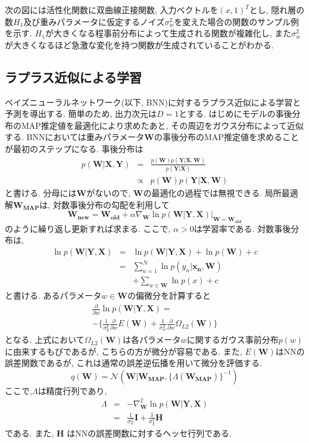 \documentclass[twocolumn]{jarticle}
\begin{document}
次の図には活性化関数に双曲線正接関数, 入力ベクトルを${(x, 1)^T}$とし, 隠れ層の数${H_1}$及び重みパラメータに仮定するノイズ${\sigma_w^2}$を変えた場合の関数のサンプル例を示す. ${H_1}$が大きくなる程事前分布によって生成される関数が複雑化し, また${\sigma_w^2}$が大きくなるほど急激な変化を持つ関数が生成されていることがわかる.

\subsection{ラプラス近似による学習}
ベイズニューラルネットワーク(以下, BNN)に対するラプラス近似による学習と予測を導出する. 簡単のため, 出力次元は${D = 1}$とする. はじめにモデルの事後分布のMAP推定値を最適化により求めたあと, その周辺をガウス分布によって近似する. BNNにおいては重みパラメータ${\bm {W}}$の事後分布のMAP推定値を求めることが最初のステップになる. 事後分布は
\begin{eqnarray}
  p(\bm {W|X, Y}) &=& \frac{p(\bm {W})p(\bm {Y|X, W})}{p(\bm {Y|X})} \nonumber \\
   &\propto& p(\bm {W})p(\bm {Y|X, W})
\end{eqnarray}
と書ける. 分母には${\bm {W}}$がないので, ${\bm {W}}$の最適化の過程では無視できる.
局所最適解${\bm {W_{MAP}}}$は, 対数事後分布の勾配を利用して
\begin{equation}
  \bm {W_{new}} = \bm {W_{old}} + \alpha \nabla_{\bm {W}} \ln p(\bm {W|Y, X})|_{\bm {W = W_{old}}}
\end{equation}
のように繰り返し更新すれば求まる. ここで, ${\alpha > 0}$は学習率である. 対数事後分布は,
\begin{eqnarray}
  \ln p(\bm {W|Y, X}) &=& \ln p(\bm {W|Y, X}) + \ln p(\bm {W}) + c \nonumber \\
  &=& \sum_{n=1}^{N} \ln p(y_n|\bm {x_n, W}) \nonumber \\
  &&+ \sum_{w \in \bm {W}} \ln p(x) + c
\end{eqnarray}
と書ける. あるパラメータ${w \in \bm {W}}$の偏微分を計算すると
\begin{eqnarray}
  \frac{\partial }{\partial w}\ln p(\bm {W|Y, X}) = \nonumber \\
  - \{\frac{1}{\sigma_y^2}\frac{\partial}{\partial w}E(\bm {W}) + \frac{1}{\sigma_w^2}\frac{\partial}{\partial w}\Omega_{L2}(\bm {W})\}
\end{eqnarray}
となる. 上式において${\Omega_{L2}(\bm {W})}$は各パラメータ${w}$に関するガウス事前分布${p(w)}$に由来するもびであるが, こちらの方が微分が容易である. また, ${E(\bm {W})}$はNNの誤差関数であるが, これは通常の誤差逆伝播を用いて微分を評価する.
\begin{equation}
  q(\bm {W}) = \mathcal{N} (\bm {W|W_{MAP}}, \{\Lambda (\bm {W_{MAP}}) \}^{-1})
\end{equation}
ここで,${\Lambda}$は精度行列であり,
\begin{eqnarray}
  \Lambda &=& - \nabla _{\bm {W}}^2 \ln p(\bm {W|Y, X}) \nonumber \\
  &=& \frac{1}{\sigma_w^2}\bm {I} + \frac{1}{\sigma_y^2}\bm {H}
\end{eqnarray}
である. また, ${\bm {H}}$ はNNの誤差関数に対するヘッセ行列である.
\end{document}
